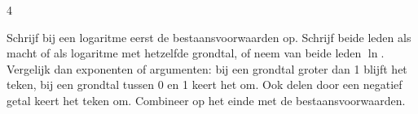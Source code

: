 \begin{alleenvoor}{4}
\begin{werkwijze}
Schrijf bij een logaritme eerst de bestaansvoorwaarden op. Schrijf beide leden als macht of als logaritme met hetzelfde grondtal, of neem van beide leden $\ln$. Vergelijk dan exponenten of argumenten: bij een grondtal groter dan 1 blijft het teken, bij een grondtal tussen 0 en 1 keert het om. Ook delen door een negatief getal keert het teken om. Combineer op het einde met de bestaansvoorwaarden.
\end{werkwijze}

\begin{oefeningen}
\end{oefeningen}
\end{alleenvoor}

\opdrachtenkop

\begin{oefeningen}


























\end{oefeningen}

